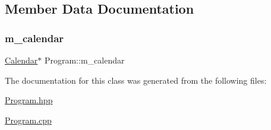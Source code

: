 \subsection{Member Data Documentation}
\mbox{\label{classProgram_a851d360e6d0aa789dc891896ea75dcbb}} 
\subsubsection{\texorpdfstring{m\+\_\+calendar}{m\_calendar}}
{\footnotesize\ttfamily \hyperlink{classCalendar}{Calendar}$\ast$ Program\+::m\+\_\+calendar\hspace{0.3cm}{\ttfamily [private]}}



The documentation for this class was generated from the following files\+:\begin{DoxyCompactItemize}
\item 
\hyperlink{Program_8hpp}{Program.\+hpp}\item 
\hyperlink{Program_8cpp}{Program.\+cpp}\end{DoxyCompactItemize}
